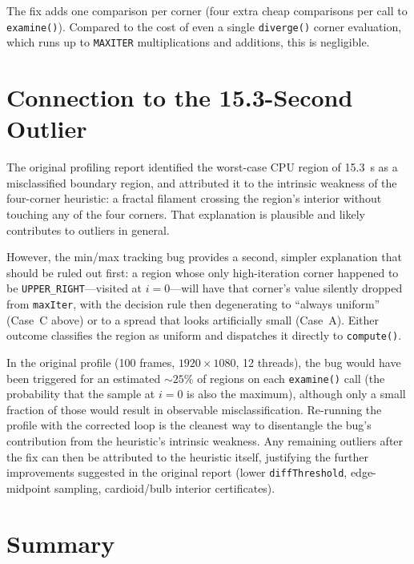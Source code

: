 \documentclass[
	english,
	letterpaper, oneside
]{article}
\begin{document}
The fix adds one comparison per corner (four extra cheap comparisons
per call to \texttt{examine()}). Compared to the cost of even a single
\texttt{diverge()} corner evaluation, which runs up to
\texttt{MAXITER} multiplications and additions, this is negligible.

\section{Connection to the 15.3-Second Outlier}

The original profiling report identified the worst-case CPU region of
15.3~s as a misclassified boundary region, and attributed it to the
intrinsic weakness of the four-corner heuristic: a fractal filament
crossing the region's interior without touching any of the four corners.
That explanation is plausible and likely contributes to outliers in
general.

However, the min/max tracking bug provides a second, simpler explanation
that should be ruled out first: a region whose only high-iteration corner
happened to be \texttt{UPPER\_RIGHT}—visited at $i=0$—will have that
corner's value silently dropped from \texttt{maxIter}, with the
decision rule then degenerating to ``always uniform'' (Case~C above) or
to a spread that looks artificially small (Case~A). Either outcome
classifies the region as uniform and dispatches it directly to
\texttt{compute()}.

In the original profile (100 frames, $1920 \times 1080$, 12 threads),
the bug would have been triggered for an estimated $\sim 25\%$ of
regions on each \texttt{examine()} call (the probability that the
sample at $i=0$ is also the maximum), although only a small fraction
of those would result in observable misclassification. Re-running the
profile with the corrected loop is the cleanest way to disentangle the
bug's contribution from the heuristic's intrinsic weakness. Any
remaining outliers after the fix can then be attributed to the
heuristic itself, justifying the further improvements suggested in the
original report (lower \texttt{diffThreshold}, edge-midpoint sampling,
cardioid/bulb interior certificates).

\section{Summary}
\end{document}
